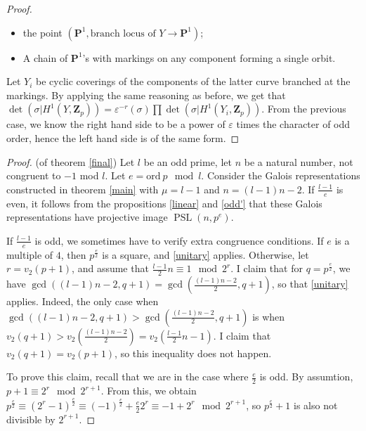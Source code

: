 \documentclass{article}
\theoremstyle{definition}
\newtheorem*{remark}{Remark}
\DeclareMathOperator{\PSL}{\mathrm{PSL}}
\begin{document}
\begin{proof}
	\begin{itemize}
		\item the point $(\mathbf{P}^1, \text{branch locus of } Y \to \mathbf{P}^1)$;
		\item A chain of $\mathbf{P}^1$'s with markings on any component forming a single orbit.
	\end{itemize}
	Let $Y_i$ be cyclic coverings of the components of the latter curve branched at the markings. By applying the same reasoning as before, we get that $\det(\sigma | H^1(Y, \mathbf{Z}_p)) = \varepsilon^{-r}(\sigma) \prod \det(\sigma | H^1(Y_i, \mathbf{Z}_p))$. From the previous case, we know the right hand side to be a power of $\varepsilon$ times the character of odd order, hence the left hand side is of the same form.
	\end{proof}
	\begin{proof} (of theorem \ref{final})
		Let $l$ be an odd prime, let $n$ be a natural number, not congruent to $-1$ mod $l$. Let $e = \mathrm{ord}\ p \mod l$. Consider the Galois representations constructed in theorem \ref{main} with $\mu = l-1$ and $n = (l-1)n - 2$. If $\frac{l-1}{e}$ is even, it follows from the propositions \ref{linear} and \ref{odd'} that these Galois representations have projective image $\PSL(n,p^e)$. \par 
		If $\frac{l-1}{e}$ is odd, we sometimes have to verify extra congruence conditions. If $e$ is a multiple of $4$, then $p^{\frac{e}{2}}$ is a square, and \ref{unitary} applies. Otherwise, let $r = v_2(p+1)$, and assume that $\frac{l-1}{2} n \equiv 1 \mod 2^r$. I claim that for $q=p^{\frac{e}{2}}$, we have $\gcd((l-1)n-2,q+1)=\gcd(\frac{(l-1)n-2}{2},q+1)$, so that \ref{unitary} applies. Indeed, the only case when $\gcd((l-1)n-2,q+1)>\gcd(\frac{(l-1)n-2}{2},q+1)$ is when $v_2(q+1) > v_2(\frac{(l-1)n-2}{2})= v_2(\frac{l-1}{2}n - 1)$. I claim that $v_2(q+1) = v_2(p+1)$, so this inequality does not happen. \par 
		To prove this claim, recall that we are in the case where $\frac{e}{2}$ is odd. By assumtion, $p + 1 \equiv 2^r \mod 2^{r+1}$. From this, we obtain $p^{\frac{e}{2}} \equiv (2^r - 1)^{\frac{e}{2}} \equiv (-1)^{\frac{e}{2}} + \frac{e}{2} 2^r \equiv -1 + 2^r \mod 2^{r+1}$, so $p^{\frac{e}{2}} + 1$ is also not divisible by $2^{r+1}$.
	\end{proof}
\end{document}
